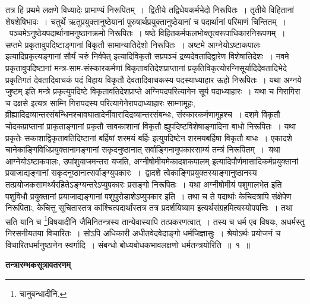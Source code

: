 \documentclass[11pt, openany]{book}
\makeatletter
\def\blfootnote{\gdef\@thefnmark{}\@footnotetext}
\makeatother
\begin{document}
तत्र हि {\br प्रथमे लक्षणे} विध्यादेः प्रामाण्यं निरूपितम्~।~{\br द्वितीये} तद्विधेयकर्मभेदो निरूपितः~। {\br तृतीये} विहितानां शेषशेषिभावः~। {\br चतुर्थे} ऋतुप्रयुक्तानुष्ठेयानां पुरुषार्थप्रयुक्तानुष्ठेयानां च पदार्थानां परिमाणं चिन्तितम्~।~{\br पञ्चमे}ऽनुष्ठेयपदार्थानामनुष्ठानक्रमो निरूपितः~। {\br षष्ठे} विहितकर्मफलभोक्तृत्वरूपाधिकारनिरूपणम्~। {\br सप्तमे} प्रकृतावुपदिष्टाङ्गानां विकृतौ सामान्यातिदेशो निरूपितः~। {\br अष्टमे} {\qt आग्नेयोऽष्टाकपालः} इत्यादिप्रकृत्यङ्गानां {\qt सौर्यं चरुं निर्वपेत्} इत्यादिविकृतौ \blfootnote{पाठा०- $^{१}${\qt सप्तदशद्रव्य}.}\footnotemark सप्रपञ्चं द्रव्यदेवतादिद्वारेण विशेषातिदेशः~।
{\br नवमे} प्रकृतावुपदिष्टानां मन्त्र-साम-संस्कारकर्मणां विकृतावतिदेशप्राप्तानां प्रकृतिविकृत्योरग्निसूर्यादिदेवतादिभेदे प्रकृतिगतं देवतादिवाचकं पदं विहाय विकृतौ देवतादिवाचकस्य पदस्याध्याहार ऊहो निरूपितः~। यथा {\qt अग्नये जुष्टम्} इति मन्त्रे प्रकृत्युपदिष्टे विकृतावतिदेशप्राप्ते {\qt अग्नि}पदपरित्यागेन {\qt सूर्य} पदाध्याहारः~। यथा च {\qt गिरागिरा च दक्षसे} इत्यत्र साम्नि {\qt गिरा}पदस्य परित्यागेनेरापदाध्याहारः साम्नामूहः, व्रीह्यादिद्रव्यान्तरसंबन्धिनश्चावघातादेर्नीवारादिद्रव्यान्तरसंबन्धः, संस्कारकर्मणामूहश्च~। {\br दशमे} विकृतौ चोदकप्राप्तानां प्राकृताङ्गानां प्रकृतौ सावकाशानां विकृतौ ह्युपदिष्टविशेषाङ्गादिना बाधो निरूपितः~। यथा  प्रकृतेः सकाशाद्विकृतावतिदिष्टानां बर्हिषां {\qt शरमयं बर्हिः} इत्युपदिष्टेन शरमयबर्हिषा विकृतौ बाधः~। {\br एकादशे} चानेकाङ्गिविधिप्रयुक्तानामङ्गानां सकृदनुष्ठानात् सर्वाङ्गिनामुपकारसाम्यं तन्त्रं निरूपितम्~।~यथा {\qt आग्नेयोऽष्टाकपालः, उपांशुयाजमन्तरा यजति, अग्नीषोमीयमेकादशकपालम्} इत्यादिपौर्णमासादिकर्मप्रयुक्तानां
प्रयाजाद्यङ्गानां सकृदनुष्ठानात्सर्वाङ्ग्युपकारः~।~{\br द्वादशे} त्वेकाङ्गिप्रयुक्तस्याङ्गानुष्ठानस्य तत्प्रयोजकसामर्थ्यरहितेऽङ्ग्यन्तरेऽप्युपकारः प्रसङ्गो निरूपितः~। यथा
{\qt अग्नीषोमीयं पशुमालभेत} इति पशुविधौ प्रयुक्तानां प्रयाजाद्यङ्गानां पशुपुरोडाशेऽप्युपकार इति~। तथा च ते पदार्थाः केचिदत्रापि संक्षेपेण निरूपिताः, केचित्तु सूचितास्तत्र कांश्चित्पदार्थांस्तत्र तत्र प्रदर्शयिष्याम इत्यर्थसंग्रहमित्यस्योपपत्तिः~। तथा सति यानि च \footnote{{\qt चानुबन्धादीनि}.}विषयादीनि जैमिनितन्त्रस्य तान्येवास्यापि तत्प्रकरणत्वात्~। तस्य च धर्म एव विषयः, अधर्मस्तु निरसनीयतया विचारितः~। सोऽपि अधिकारी अधीतवेदवेदाङ्गो धर्मजिज्ञासुः~। श्रेयोऽर्थः प्रयोजनं च विचारितधर्मानुष्ठानेन स्वर्गादि~। संबन्धो बोध्यबोधकभावलक्षणो धर्मतन्त्रयोरिति~॥~१~॥
\newpage
\begin{center}
 \textbf{तन्त्रारम्भकसूत्रावतरणम्}    
\end{center}
\end{document}
